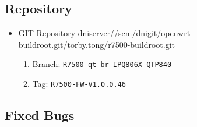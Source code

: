 \documentclass[12pt]{report}
\newcommand{\tlabel}[1]{
  \label{#1}%
  }
\begin{document}
\tlabel{sec:1-0-1}
\subsection{Repository}
\begin{itemize}
	\item GIT Repository dniserver//scm/dnigit/openwrt-buildroot.git/torby.tong/r7500-buildroot.git
	\begin{enumerate}
		\item Branch: \texttt{R7500-qt-br-IPQ806X-QTP840}
                \item Tag: \texttt{R7500-FW-V1.0.0.46}
	\end{enumerate}
\end{itemize}

    \subsection{Fixed Bugs}
\end{document}
